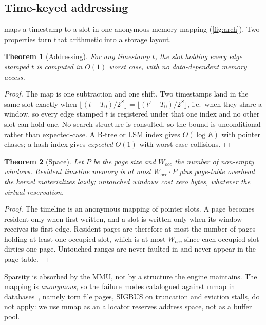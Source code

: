\documentclass[letterpaper,twocolumn,10pt]{article}
\newtheorem{theorem}{Theorem}
\begin{document}
\subsection{Time-keyed addressing}
 maps a timestamp to a slot in one anonymous memory
mapping (\cref{fig:arch}). Two properties turn that arithmetic into a
storage layout.

\begin{theorem}[Addressing]
\label{thm:addr}
For any timestamp $t$, the slot holding every edge stamped $t$ is
computed in $O(1)$ worst case, with no data-dependent memory access.
\end{theorem}
\begin{proof}
The map is one subtraction and one shift. Two timestamps land in the
same slot exactly when $\lfloor (t-T_0)/2^S \rfloor = \lfloor
(t'-T_0)/2^S \rfloor$, i.e.\ when they share a window, so every edge
stamped $t$ is registered under that one index and no other slot can
hold one. No search structure is consulted, so the bound is
unconditional rather than expected-case. A B-tree or LSM index gives
$O(\log E)$ with pointer chases; a hash index gives \emph{expected}
$O(1)$ with worst-case collisions.
\end{proof}

\begin{theorem}[Space]
\label{thm:space}
Let $P$ be the page size and $W_{occ}$ the number of non-empty
windows. Resident timeline memory is at most $W_{occ}\cdot P$ plus
page-table overhead the kernel materializes lazily; untouched windows
cost zero bytes, whatever the virtual reservation.
\end{theorem}
\begin{proof}
The timeline is an anonymous mapping of pointer slots. A page becomes
resident only when first written, and a slot is written only when its
window receives its first edge. Resident pages are therefore at most
the number of pages holding at least one occupied slot, which is at
most $W_{occ}$ since each occupied slot dirties one page. Untouched
ranges are never faulted in and never appear in the page table.
\end{proof}

Sparsity is absorbed by the MMU, not by a structure the engine
maintains. The mapping is \emph{anonymous}, so the failure modes
catalogued against mmap in databases~\cite{crotty2022mmap}, namely torn
file pages, SIGBUS on truncation and eviction stalls, do not apply: we
use
mmap as an allocator reserves address space, not as a buffer pool.
\end{document}
